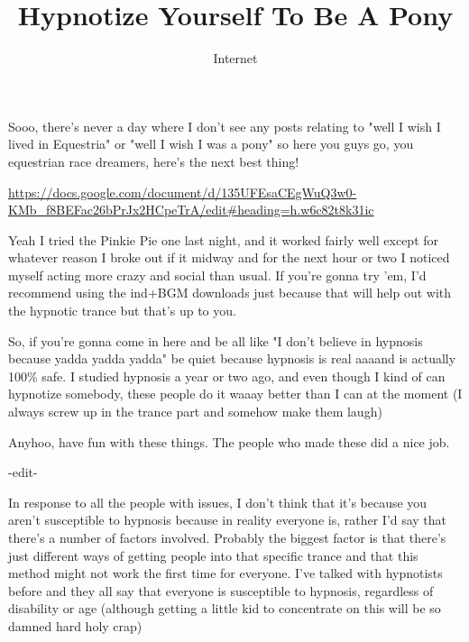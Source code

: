 \documentclass[ebook,12pt,oneside,openany]{memoir}
\begin{document}
\title{Hypnotize Yourself To Be A Pony}
\author{Internet}
\maketitle

\newpage\begin{tcolorbox}[title=Lord Bababa,colback=red!5!white,colframe=red!75!black,coltitle=white]
\par{Sooo, there's never a day where I don't see any posts relating to "well I wish I lived in Equestria" or "well I wish I was a pony" so here you guys go, you equestrian race dreamers, here's the next best thing!}
\newline{}
\par{\href{https://docs.google.com/document/d/135UFEsaCEgWuQ3w0-KMb\_f8BEFac26bPrJx2HCpeTrA/edit\#heading=h.w6c82t8k31ic}{https://docs.google.com/document/d/135UFEsaCEgWuQ3w0-KMb\_f8BEFac26bPrJx2HCpeTrA/edit\#heading=h.w6c82t8k31ic}}
\newline{}
\newline{}
\par{Yeah I tried the Pinkie Pie one last night, and it worked fairly well except for whatever reason I broke out if it midway and for the next hour or two I noticed myself acting more crazy and social than usual. If you're gonna try 'em, I'd recommend using the ind+BGM downloads just because that will help out with the hypnotic trance but that's up to you.}
\newline{}
\newline{}
\par{So, if you're gonna come in here and be all like "I don't believe in hypnosis because yadda yadda yadda" be quiet because hypnosis is real aaaand is actually 100\% safe. I studied hypnosis a year or two ago, and even though I kind of can hypnotize somebody, these people do it waaay better than I can at the moment (I always screw up in the trance part and somehow make them laugh)}
\newline{}
\par{Anyhoo, have fun with these things. The people who made these did a nice job.}
\newline{}
\par{-edit-}
\newline{}
\par{\textcolor[RGB]{40,40,40}{In response to all the people with issues, I don't think that it's because you aren't susceptible to hypnosis because in reality everyone is, rather I'd say that there's a number of factors involved. Probably the biggest factor is that there's just different ways of getting people into that specific trance and that this method might not work the first time for everyone. I've talked with hypnotists before and they all say that everyone is susceptible to hypnosis, regardless of disability or age (although getting a little kid to concentrate on this will be so damned hard holy crap)}
}
\end{tcolorbox}
\end{document}
